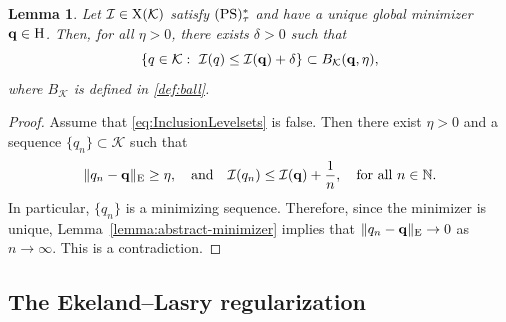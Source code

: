 \documentclass{article}
\newcommand{\boK}{\mathcal{K}}
\newcommand{\boI}{\mathcal{I}}
\newcommand{\Hilb}{{\textnormal H}}
\newcommand{\Ebanach}{{\textnormal E}}
\newcommand{\minq}{{\bf q}}
\newcommand{\ball}{B_\boK}
\newcommand{\X}{{\textnormal X}}
\newcommand{\PS}{(\textnormal{PS})^{*}_\tau}
\newtheorem{lemma}{Lemma}[section]
\theoremstyle{definition}
\begin{document}
\begin{lemma}\label{lemma-LevelSets}
	Let $\boI\in\X(\boK)$ satisfy $\PS$ and have a unique global minimizer $\minq\in\Hilb$. Then, for all $\eta>0$, there exists $\delta>0$ such that
	\begin{equation}\label{eq:InclusionLevelsets}
		\{q\in\boK:\ \boI(q)\leq\boI(\minq)+\delta\}\subset B_\boK(\minq,\eta),
	\end{equation}
    where $\ball$ is defined in \eqref{def:ball}.
\end{lemma}
\begin{proof}
Assume that \eqref{eq:InclusionLevelsets} is false. Then there exist $\eta>0$ and a sequence $\{q_n\}\subset\boK$ such that
	\begin{equation}\label{eq:Claim-False}
		\|q_n-\minq\|_{\textnormal E}\geq\eta,\quad\hbox{and}\quad	\boI(q_n)\leq \boI(\minq)+\dfrac{1}{n},\quad\hbox{for all }n\in\mathbb{N}.
	\end{equation}
	In particular, $\{q_n\}$ is a minimizing sequence. Therefore, since the minimizer is unique, Lemma~\ref{lemma:abstract-minimizer} implies that
    $\|q_n-\minq\|_\Ebanach\to 0$ as $n\to\infty$. This is a contradiction.
\end{proof}



\subsection{The Ekeland--Lasry regularization}\label{Sect:eke-las}
\end{document}
